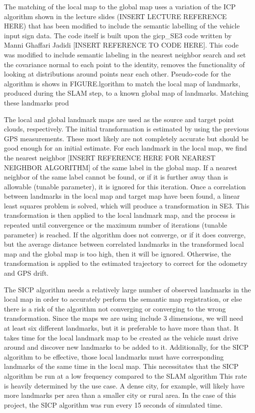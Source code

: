 \documentclass[letterpaper, 10 pt, conference]{ieeeconf}  %
\begin{document}
The matching of the local map to the global map uses a variation of the ICP algorithm shown in the lecture slides (INSERT LECTURE REFERENCE HERE) that has been modified to include the semantic labelling of the vehicle input sign data. The code itself is built upon the gicp\_SE3 code written by Manni Ghaffari Jadidi [INSERT REFERENCE TO CODE HERE]. This code was modified to include semantic labeling in the nearest neighbor search and set the covariance normal to each point to the identity, removes the functionality of looking at distributions around points near each other. Pseudo-code for the algorithm is shows in FIGURE.lgorithm to match the local map of landmarks, produced during the SLAM step, to a known global map of landmarks. Matching these landmarks prod

The local and global landmark maps are used as the source and target point clouds, respectively. The initial transformation is estimated by using the previous GPS measurements. These most likely are not completely accurate but should be good enough for an initial estimate. For each landmark in the local map, we find the nearest neighbor [INSERT REFERENCE HERE FOR NEAREST NEIGHBOR ALGORITHM] of the same label in the global map. If a nearest neighbor of the same label cannot be found, or if it is further away than is allowable (tunable parameter), it is ignored for this iteration. Once a correlation between landmarks in the local map and target map have been found, a linear least squares problem is solved, which will produce a transformation in SE3. This transformation is then applied to the local landmark map, and the process is repeated until convergence or the maximum number of iterations (tunable parameter) is reached. If the algorithm does not converge, or if it does converge, but the average distance between correlated landmarks in the transformed local map and the global map is too high, then it will be ignored. Otherwise, the transformation is applied to the estimated trajectory to correct for the odometry and GPS drift.

The SICP algorithm needs a relatively large number of observed landmarks in the local map in order to accurately perform the semantic map registration, or else there is a risk of the algorithm not converging or converging to the wrong transformation. Since the maps we are using include 3 dimensions, we will need at least six different landmarks, but it is preferable to have more than that. It takes time for the local landmark map to be created as the vehicle must drive around and discover new landmarks to be added to it. Additionally, for the SICP algorithm to be effective, those local landmarks must have corresponding landmarks of the same time in the local map. This necessitates that the SICP algorithm be run at a low frequency compared to the SLAM algorithm This rate is heavily determined by the use case. A dense city, for example, will likely have more landmarks per area than a smaller city or rural area. In the case of this project, the SICP algorithm was run every 15 seconds of simulated time.
\end{document}

